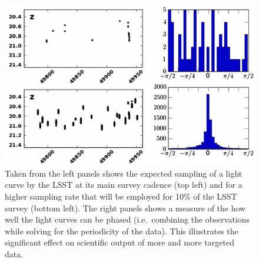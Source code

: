 \documentclass[useAMS,usenatbib,tightenlines,11pt,preprint]{aastex}
\begin{document}
%




\begin{figure}[th]
\centerline{
\includegraphics[scale=1.0]{rrlyrae.png}
}
\caption{
Taken from \citet{rrlyrae} the left panels shows the expected
sampling of
a light curve by the LSST at its main survey cadence (top left) and
for a higher sampling rate that will be employed for 10\% of the LSST
survey (bottom left). The right panels shows a measure of the  how well
the light curves can be phased (i.e.\ combining the observations while solving
for the periodicity of the data). This illustrates the significant effect
on scientific output of more and more targeted data.}

\label{fig:RRLyrae}
\end{figure}
\end{document}
